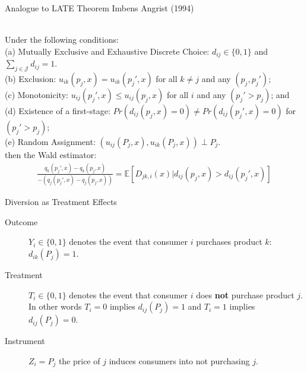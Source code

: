 \documentclass[xcolor=pdftex,dvipsnames,table,mathserif,aspectratio=169]{beamer}
\begin{document}
\begin{frame}{Analogue to LATE Theorem Imbens Angrist (1994)}
\begin{theorem}\ \\
\label{prop:late}
Under the following conditions:\\ 
(a) Mutually Exclusive and Exhaustive Discrete Choice: $d_{ij} \in \{0,1\}$ and $\sum_{j \in \mathcal{J}} d_{ij}=1$.\\
(b) Exclusion: $u_{ik}(p_j,x)=u_{ik}(p_j',x)$ for all $k \neq j$ and any $(p_j, p_j')$; \\
(c) Monotonicity: $u_{ij}(p_j',x) \leq u_{ij}(p_j,x)$ for all $i$ and any $(p_j' > p_{j})$; and \\
(d) Existence of a first-stage: $Pr(d_{ij}(p_j,x)=0) \neq Pr(d_{ij}(p_j',x)=0) $ for $(p_j' > p_{j})$; \\
(e) Random Assignment: $(u_{ij}(P_j,x),u_{ik}(P_j,x)) \perp P_j$. \\
\noindent
then the Wald estimator:
\begin{align*}
 \frac{q_k(p_j',x) - q_k(p_j,x)}{-\left(q_j(p_j',x) - q_j(p_j,x)\right)}=\mathbb{E}[D_{jk,i}(x) | d_{ij}(p_j,x) > d_{ij}(p_j',x)]
\end{align*}
\end{theorem}
\end{frame}

\begin{frame}{Diversion as Treatment Effects}
\begin{description}
\item[Outcome] $Y_i \in \{0,1\}$ denotes the event that consumer $i$ purchases product $k$: $d_{ik}(P_j)=1$.
\item[Treatment] $T_i \in \{0,1\}$ denotes the event that consumer $i$ does \textbf{not} purchase product $j$. In other words $T_i = 0$ implies $d_{ij}(P_j)=1$ and $T_i=1$ implies $d_{ij}(P_j)=0$.
\item[Instrument] $Z_i = P_j$ the price of $j$ induces consumers into not purchasing $j$.
\end{description}
\end{frame}
\end{document}
